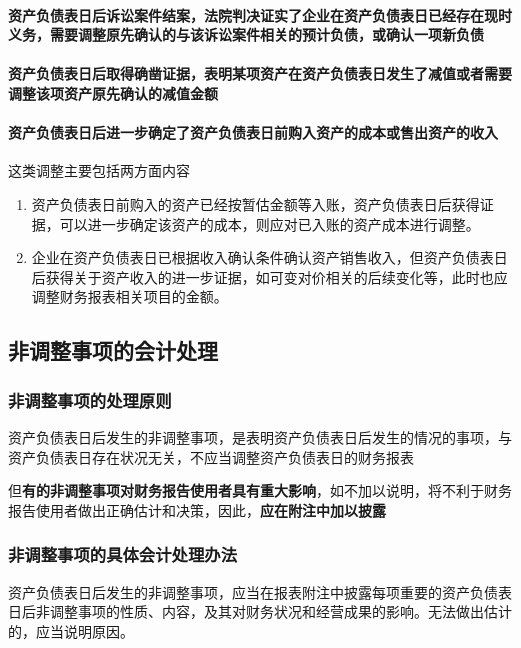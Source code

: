 \documentclass[UTF8,12pt]{ctexart}
\numberwithin{equation}{section} %
\numberwithin{figure}{section}
\numberwithin{table}{section}
\begin{document}
	\paragraph{资产负债表日后诉讼案件结案，法院判决证实了企业在资产负债表日已经存在现时义务，需要调整原先确认的与该诉讼案件相关的预计负债，或确认一项新负债}
	
	\paragraph{资产负债表日后取得确凿证据，表明某项资产在资产负债表日发生了减值或者需要调整该项资产原先确认的减值金额}
	
	\paragraph{资产负债表日后进一步确定了资产负债表日前购入资产的成本或售出资产的收入}
	
	这类调整主要包括两方面内容
	\begin{enumerate}
		\item 资产负债表日前购入的资产已经按暂估金额等入账，资产负债表日后获得证据，可以进一步确定该资产的成本，则应对已入账的资产成本进行调整。
		
		\item 企业在资产负债表日已根据收入确认条件确认资产销售收入，但资产负债表日后获得关于资产收入的进一步证据，如可变对价相关的后续变化等，此时也应调整财务报表相关项目的金额。
	\end{enumerate}
	
	\subsection{非调整事项的会计处理}
	\subsubsection{非调整事项的处理原则}
	资产负债表日后发生的非调整事项，是表明资产负债表日后发生的情况的事项，与资产负债表日存在状况无关，不应当调整资产负债表日的财务报表
	
	但\textbf{有的非调整事项对财务报告使用者具有重大影响}，如不加以说明，将不利于财务报告使用者做出正确估计和决策，因此，\textbf{应在附注中加以披露}
	
	
	\subsubsection{非调整事项的具体会计处理办法}
	资产负债表日后发生的非调整事项，应当在报表附注中披露每项重要的资产负债表日后非调整事项的性质、内容，及其对财务状况和经营成果的影响。无法做出估计的，应当说明原因。
	
\end{document}
